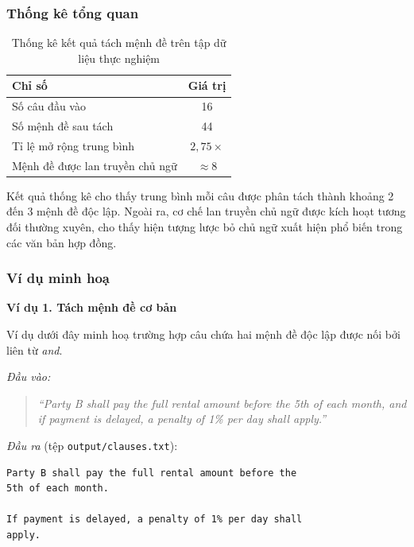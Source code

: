 \subsubsection{Thống kê tổng quan}

\begin{table}[H]
    \centering
    \caption{Thống kê kết quả tách mệnh đề trên tập dữ liệu thực nghiệm}
    \label{tab:clause-stats}
    \begin{tabular}{|l|c|}
        \hline
        \textbf{Chỉ số} & \textbf{Giá trị} \\
        \hline
        Số câu đầu vào                    & 16 \\
        Số mệnh đề sau tách               & 44 \\
        Tỉ lệ mở rộng trung bình          & $2{,}75\times$ \\
        Mệnh đề được lan truyền chủ ngữ   & ${\approx}8$ \\
        \hline
    \end{tabular}
\end{table}

Kết quả thống kê cho thấy trung bình mỗi câu được phân tách thành khoảng
2 đến 3 mệnh đề độc lập. Ngoài ra, cơ chế lan truyền chủ ngữ được kích
hoạt tương đối thường xuyên, cho thấy hiện tượng lược bỏ chủ ngữ xuất hiện
phổ biến trong các văn bản hợp đồng.

\subsubsection{Ví dụ minh hoạ}

\textbf{Ví dụ 1. Tách mệnh đề cơ bản}

Ví dụ dưới đây minh hoạ trường hợp câu chứa hai mệnh đề độc lập được nối
bởi liên từ \textit{and}.

\hspace*{0.5cm}\textit{Đầu vào:}

\begin{quote}
    \textit{``Party B shall pay the full rental amount before the 5th
    of each month, and if payment is delayed, a penalty of 1\% per day
    shall apply.''}
\end{quote}

\hspace*{0.5cm}\textit{Đầu ra} (tệp \texttt{output/clauses.txt}):

\begin{verbatim}
Party B shall pay the full rental amount before the
5th of each month.

If payment is delayed, a penalty of 1% per day shall
apply.
\end{verbatim}

